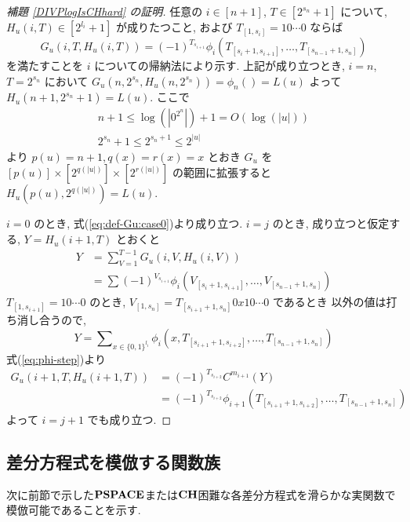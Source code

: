 \begin{proof}[\rm 補題 \ref{DIVPlogIsCHhard} の証明]
 任意の $i \in [n+1]$, $T \in [2^{s_n}+1]$ について,
 $H_u(i,T) \in [2^{l_i}+1]$ が成りたつこと,
 および $T_{[1,s_i]} = 10 \cdots 0$ ならば
 \begin{equation} \label{eq:subformula}
  G_u(i,T,H_u(i,T)) = (-1)^{T_{s_{i+1}}} 
   \phi_i(T_{[s_i+1, s_{i+1}]}, \dots, T_{[s_{n-1}+1, s_n]})
 \end{equation}
 を満たすことを $i$ についての帰納法により示す.
 上記が成り立つとき,
 $i=n$, $T=2^{s_n}$ において $G_u(n, 2^{s_n}, H_u(n,2^{s_n})) = \phi_n() = L(u)$
 よって $H_u(n+1, 2^{s_n}+1) = L(u)$.
 ここで 
 \begin{gather}
  n+1 \le \log(|0^{2^n}|) + 1 = O(\log(|u|)) \\
  2^{s_n}+1 \le 2^{s_n+1} \le 2^{|u|}
 \end{gather}
 より $p(u) = n+1, q(x) = r(x) = x$ とおき $G_u$ を
 $[p(u)] \times [2^{q(|u|)}] \times [2^{r(|u|)}]$ の範囲に拡張すると
 $H_u(p(u), 2^{q(|u|)}) = L(u)$.

 $i=0$ のとき, 式(\ref{eq:def-Gu:case0})より成り立つ.
 $i=j$ のとき, 成り立つと仮定する, $Y = H_u(i+1, T)$ とおくと
 \begin{align}
  Y 
  &= \sum_{V = 1}^{T-1} G_u(i, V, H_u(i, V)) \\
  &= \sum (-1)^{V_{s_{i+1}}} \phi_i(V_{[s_i+1, s_{i+1}]}, 
   \dots, V_{[s_{n-1}+1, s_n]})
 \end{align}
 $T_{[1, s_{i+1}]} = 10 \cdots 0$ のとき,
 $V_{[1, s_n]} = T_{[s_{i+1}+1,s_n]} 0 x 1 0 \cdots 0$ であるとき
 以外の値は打ち消し合うので,
 \begin{equation}
  Y = \sum\nolimits_{x \in \{0,1\}^{l_i}} 
  \phi_i(x, T_{[s_{i+1}+1, s_{i+2}]}, \dots, T_{[s_{n-1}+1, s_n]})
 \end{equation}
 式(\ref{eq:phi-step})より
 \begin{align}
  G_u(i+1,T,H_u(i+1,T)) 
  &= (-1)^{T_{s_{i+2}}} C^{m_{i+1}} (Y)\\
  &= (-1)^{T_{s_{i+2}}} \phi_{i+1}(T_{[s_{i+1}+1, s_{i+2}]}, \dots, T_{[s_{n-1}+1, s_n]})
 \end{align}
 よって $i=j+1$ でも成り立つ.
 \end{proof}



\subsection{差分方程式を模倣する関数族}
\label{subsection: ode family}
次に前節で示した$\mathbf{PSPACE}$または$\mathbf{CH}$困難な各差分方程式を滑らかな実関数で模倣可能であることを示す.

